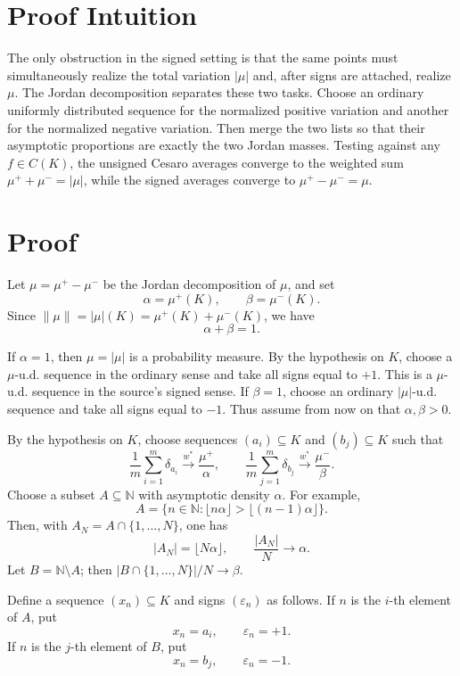\documentclass[11pt]{article}
\newcommand{\N}{\mathbb N}
\begin{document}
\section*{Proof Intuition}

The only obstruction in the signed setting is that the same points must
simultaneously realize the total variation \(|\mu|\) and, after signs are
attached, realize \(\mu\).  The Jordan decomposition separates these two
tasks.  Choose an ordinary uniformly distributed sequence for the normalized
positive variation and another for the normalized negative variation.  Then
merge the two lists so that their asymptotic proportions are exactly the two
Jordan masses.  Testing against any \(f\in C(K)\), the unsigned Cesaro
averages converge to the weighted sum \(\mu^++\mu^-=|\mu|\), while the signed
averages converge to \(\mu^+-\mu^-=\mu\).

\section*{Proof}

Let \(\mu=\mu^+-\mu^-\) be the Jordan decomposition of \(\mu\), and set
\[
   \alpha=\mu^+(K),\qquad \beta=\mu^-(K).
\]
Since \(\|\mu\|=|\mu|(K)=\mu^+(K)+\mu^-(K)\), we have
\[
   \alpha+\beta=1.
\]

If \(\alpha=1\), then \(\mu=|\mu|\) is a probability measure.  By the
hypothesis on \(K\), choose a \(\mu\)-u.d. sequence in the ordinary sense and
take all signs equal to \(+1\).  This is a \(\mu\)-u.d. sequence in the
source's signed sense.  If \(\beta=1\), choose an ordinary \(|\mu|\)-u.d.
sequence and take all signs equal to \(-1\).  Thus assume from now on that
\(\alpha,\beta>0\).

By the hypothesis on \(K\), choose sequences \((a_i)\subseteq K\) and
\((b_j)\subseteq K\) such that
\[
 \frac{1}{m}\sum_{i=1}^m \delta_{a_i}\overset{w^*}{\longrightarrow}
       \frac{\mu^+}{\alpha},
 \qquad
 \frac{1}{m}\sum_{j=1}^m \delta_{b_j}\overset{w^*}{\longrightarrow}
       \frac{\mu^-}{\beta}.
\]
Choose a subset \(A\subseteq\N\) with asymptotic density \(\alpha\).  For
example,
\[
   A=\{n\in\N:\lfloor n\alpha\rfloor>\lfloor(n-1)\alpha\rfloor\}.
\]
Then, with \(A_N=A\cap\{1,\ldots,N\}\), one has
\[
   |A_N|=\lfloor N\alpha\rfloor,\qquad
   \frac{|A_N|}{N}\to\alpha.
\]
Let \(B=\N\setminus A\); then \(|B\cap\{1,\ldots,N\}|/N\to\beta\).

Define a sequence \((x_n)\subseteq K\) and signs \((\varepsilon_n)\) as
follows.  If \(n\) is the \(i\)-th element of \(A\), put
\[
   x_n=a_i,\qquad \varepsilon_n=+1.
\]
If \(n\) is the \(j\)-th element of \(B\), put
\[
   x_n=b_j,\qquad \varepsilon_n=-1.
\]
\end{document}
